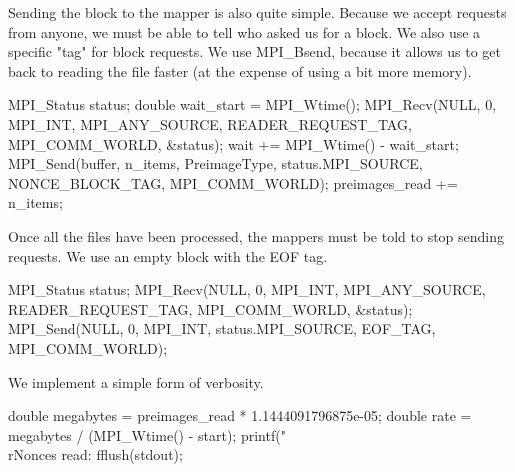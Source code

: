 \documentclass{article}%
\begin{document}
\nwendcode{}Sending the block to the mapper is also quite simple. Because we accept
requests from anyone, we must be able to tell who asked us for a block. We
also use a specific "tag" for block requests. We use {\Tt{}MPI{\_}Bsend\nwendquote}, because it
allows us to get back to reading the file faster (at the expense of using a
bit more memory).


\nwenddocs{}\endmoddef\nwstartdeflinemarkup{}\nwenddeflinemarkup
MPI_Status status;
double wait_start = MPI_Wtime();
MPI_Recv(NULL, 0, MPI_INT, MPI_ANY_SOURCE, READER_REQUEST_TAG, MPI_COMM_WORLD, &status);
wait += MPI_Wtime() - wait_start;
MPI_Send(buffer, n_items, PreimageType, status.MPI_SOURCE, NONCE_BLOCK_TAG, MPI_COMM_WORLD);
preimages_read += n_items;

\nwendcode{}Once all the files have been processed, the mappers must be told to stop
sending requests. We use an empty block with the EOF tag.

\nwenddocs{}\endmoddef\nwstartdeflinemarkup{}\nwenddeflinemarkup
MPI_Status status;
MPI_Recv(NULL, 0, MPI_INT, MPI_ANY_SOURCE, READER_REQUEST_TAG, MPI_COMM_WORLD, &status);
MPI_Send(NULL, 0, MPI_INT, status.MPI_SOURCE, EOF_TAG, MPI_COMM_WORLD);


\nwendcode{}We implement a simple form of verbosity.

\nwenddocs{}\endmoddef\nwstartdeflinemarkup{}\nwenddeflinemarkup
double megabytes = preimages_read * 1.1444091796875e-05;
double rate = megabytes / (MPI_Wtime() - start);
printf("\\rNonces read: %
fflush(stdout);
\end{document}
